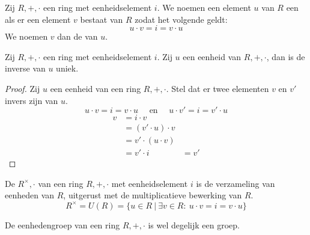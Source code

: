 \documentclass[main.tex]{subfiles}
\begin{document}
\begin{de}
  Zij $R,+,\cdot$ een ring met eenheidselement $i$.
  We noemen een element $u$ van $R$ een  als er een element $v$ bestaat van $R$ zodat het volgende geldt:
  \[ u \cdot v = i = v \cdot u \]
  We noemen $v$ dan de  van $u$.
\end{de}

\begin{st}
  Zij $R,+,\cdot$ een ring met eenheidselement $i$.
  Zij $u$ een eenheid van $R,+,\cdot$, dan is de inverse van $u$ uniek.

  \begin{proof}
    Zij $u$ een eenheid van een ring $R,+,\cdot$.
    Stel dat er twee elementen $v$ en $v'$ invers zijn van $u$.
    \[ u \cdot v = i = v \cdot u \quad\text{ en }\quad u \cdot v' = i = v' \cdot u \]
    \[
    \begin{array}{rll}
      v &= i \cdot v &\\
        &= (v' \cdot u) \cdot v &\\
        &= v' \cdot (u \cdot v) &\\
        &= v' \cdot i &= v'
    \end{array}
    \]
  \end{proof}
\end{st}

\begin{de}
  De  $R^{\times},\cdot$ van een ring $R,+,\cdot$ met eenheidselement $i$ is de verzameling van eenheden van $R$, uitgerust met de multiplicatieve bewerking van $R$.
  \[ R^{\times} = U(R) = \{ u \in R \ |\ \exists v \in R:\ u \cdot v = i = v \cdot u \} \]
\end{de}

\begin{ei}
  \label{ei:eenhedengroep-is-groep}
  De eenhedengroep van een ring $R,+,\cdot$ is wel degelijk een groep.
\end{ei}
\end{document}
